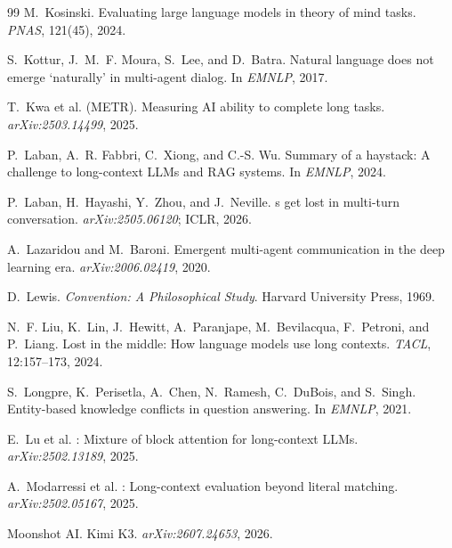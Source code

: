 \documentclass[11pt]{article}
\begin{document}
\begin{thebibliography}{99}
M.~Kosinski.
\newblock Evaluating large language models in theory of mind tasks.
\newblock \emph{PNAS}, 121(45), 2024.

S.~Kottur, J.~M.~F. Moura, S.~Lee, and D.~Batra.
\newblock Natural language does not emerge `naturally' in multi-agent dialog.
\newblock In \emph{EMNLP}, 2017.

T.~Kwa et al. (METR).
\newblock Measuring {AI} ability to complete long tasks.
\newblock \emph{arXiv:2503.14499}, 2025.

P.~Laban, A.~R. Fabbri, C.~Xiong, and C.-S. Wu.
\newblock Summary of a haystack: A challenge to long-context {LLM}s and {RAG}
systems.
\newblock In \emph{EMNLP}, 2024.

P.~Laban, H.~Hayashi, Y.~Zhou, and J.~Neville.
s get lost in multi-turn conversation.
\newblock \emph{arXiv:2505.06120}; ICLR, 2026.

A.~Lazaridou and M.~Baroni.
\newblock Emergent multi-agent communication in the deep learning era.
\newblock \emph{arXiv:2006.02419}, 2020.

D.~Lewis.
\newblock \emph{Convention: A Philosophical Study}.
\newblock Harvard University Press, 1969.

N.~F. Liu, K.~Lin, J.~Hewitt, A.~Paranjape, M.~Bevilacqua, F.~Petroni, and
P.~Liang.
\newblock Lost in the middle: How language models use long contexts.
\newblock \emph{TACL}, 12:157--173, 2024.

S.~Longpre, K.~Perisetla, A.~Chen, N.~Ramesh, C.~DuBois, and S.~Singh.
\newblock Entity-based knowledge conflicts in question answering.
\newblock In \emph{EMNLP}, 2021.

E.~Lu et al.
: Mixture of block attention for long-context {LLM}s.
\newblock \emph{arXiv:2502.13189}, 2025.

A.~Modarressi et al.
: Long-context evaluation beyond literal matching.
\newblock \emph{arXiv:2502.05167}, 2025.

Moonshot AI.
\newblock Kimi {K3}.
\newblock \emph{arXiv:2607.24653}, 2026.


\end{thebibliography}
\end{document}
